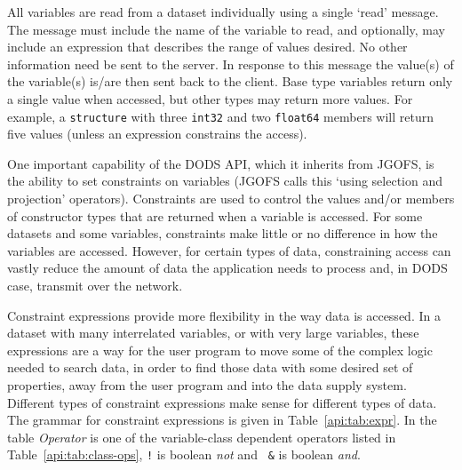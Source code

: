 All variables are read from a dataset individually using a single
`read' message. The message must include the name of the variable to
read, and optionally, may include an expression that describes the
range of values desired. No other information need be sent to the
server. In response to this message the value(s) of the variable(s)
is/are then sent back to the client.  Base type variables return only
a single value when accessed, but other types may return more
values. For example, a {\tt structure} with three {\tt int32} and two
{\tt float64} members will return five values (unless an expression
constrains the access).

One important capability of the DODS API, which it inherits from
JGOFS, is the ability to set constraints on variables (JGOFS calls
this `using selection and projection' operators).  Constraints are
used to control the values and/or members of constructor types that
are returned when a variable is accessed. For some datasets and some
variables, constraints make little or no difference in how the
variables are accessed.  However, for certain types of data,
constraining access can vastly reduce the amount of data the
application needs to process and, in DODS case, transmit over the
network.

\label{api:constraints}
Constraint expressions provide more flexibility in the way data is
accessed.  In a dataset with many interrelated variables, or with
very large variables, these expressions are a way for the user program
to move some of the complex logic needed to search data, in order to
find those data with some desired set of properties, away from the
user program and into the data supply system.  Different types of
constraint expressions make sense for different types of data. The
grammar for constraint expressions is given in
Table~\ref{api:tab:expr}.  In the table {\em Operator\/} is one of the
variable-class dependent operators listed in
Table~\ref{api:tab:class-ops}, {\tt !} is boolean {\em not\/} and {\tt
\&} is boolean {\em and}.

